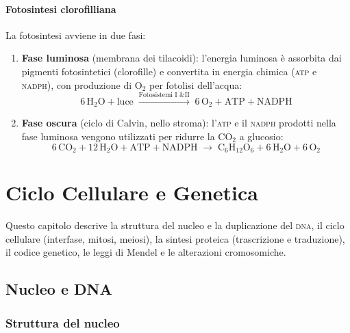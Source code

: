 \documentclass[11pt,a4paper,openright,twoside]{book}
\theoremstyle{definition}
\theoremstyle{plain}
\theoremstyle{remark}
\newcommand{\dna}{\textsc{dna}}
\newcommand{\atp}{\textsc{atp}}
\newcommand{\nadph}{\textsc{nadph}}
\newcommand{\CO}{\ensuremath{\text{CO}_2}}
\newcommand{\HO}{\ensuremath{\text{H}_2\text{O}}}
\newcommand{\Oc}{\ensuremath{\text{O}_2}}
\begin{document}
\subsubsection{Fotosintesi clorofilliana}

La fotosintesi avviene in due fasi:

\begin{enumerate}
  \item \textbf{Fase luminosa} (membrana dei tilacoidi): l'energia luminosa è assorbita dai pigmenti fotosintetici (clorofille) e convertita in energia chimica (\atp{} e \nadph), con produzione di \Oc{} per fotolisi dell'acqua:
  \begin{equation}
    6\,\HO + \text{luce} \;\xrightarrow{\text{Fotosistemi I \& II}}\; 6\,\Oc + \text{ATP} + \text{NADPH}
  \end{equation}

  \item \textbf{Fase oscura} (ciclo di Calvin, nello stroma): l'\atp{} e il \nadph{} prodotti nella fase luminosa vengono utilizzati per ridurre la \CO{} a glucosio:
  \begin{equation}
    6\,\CO + 12\,\HO + \text{ATP} + \text{NADPH} \;\to\; \text{C}_6\text{H}_{12}\text{O}_6 + 6\,\HO + 6\,\Oc
  \end{equation}
\end{enumerate}

\chapter{Ciclo Cellulare e Genetica}

\begin{tcolorbox}[summarybox, title={Sommario del capitolo}]
Questo capitolo descrive la struttura del nucleo e la duplicazione del \dna, il ciclo cellulare (interfase, mitosi, meiosi), la sintesi proteica (trascrizione e traduzione), il codice genetico, le leggi di Mendel e le alterazioni cromosomiche.
\end{tcolorbox}

\section{Nucleo e DNA}

\subsection{Struttura del nucleo}
\end{document}
